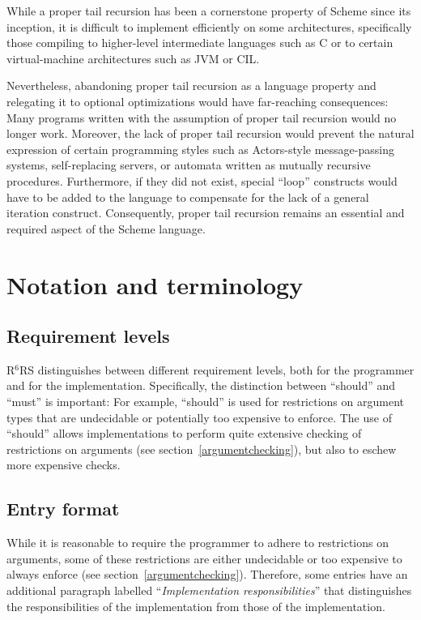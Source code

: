 \documentclass[twoside,twocolumn]{algol60}
\newcommand{\rn}[1]{R$^{#1}$RS}
\begin{document}
While a proper tail recursion has been a cornerstone property of
Scheme since its inception, it is difficult to implement efficiently
on some architectures, specifically those compiling to higher-level
intermediate languages such as C or to certain virtual-machine
architectures such as JVM or CIL.

Nevertheless, abandoning proper tail recursion as a language property
and relegating it to optional optimizations would have far-reaching
consequences: Many programs written with the assumption of proper tail
recursion would no longer work.  Moreover, the lack of proper tail
recursion would prevent the natural expression of certain programming
styles such as Actors-style message-passing systems, self-replacing
servers, or automata written as mutually recursive procedures.
Furthermore, if they did not exist, special ``loop'' constructs would
have to be added to the language to compensate for the lack of a general
iteration construct.  Consequently, proper tail recursion remains an
essential and required aspect of the Scheme language.

\chapter{Notation and terminology}

\section{Requirement levels}

\rn{6} distinguishes between different requirement levels, both for
the programmer and for the implementation.  Specifically, the
distinction between ``should'' and ``must'' is important: For example,
``should'' is used for restrictions on argument types that are
undecidable or potentially too expensive to enforce.  The use of
``should'' allows implementations to perform quite extensive checking
of restrictions on arguments (see section~\ref{argumentchecking}), but
also to eschew more expensive checks.

\section{Entry format}

While it is reasonable to require the programmer to adhere to
restrictions on arguments, some of these restrictions are either
undecidable or too expensive to always enforce (see
section~\ref{argumentchecking}).  Therefore, some entries have
an additional paragraph labelled ``\textit{Implementation
  responsibilities}'' that distinguishes the responsibilities of the
implementation from those of the implementation.
\end{document}
